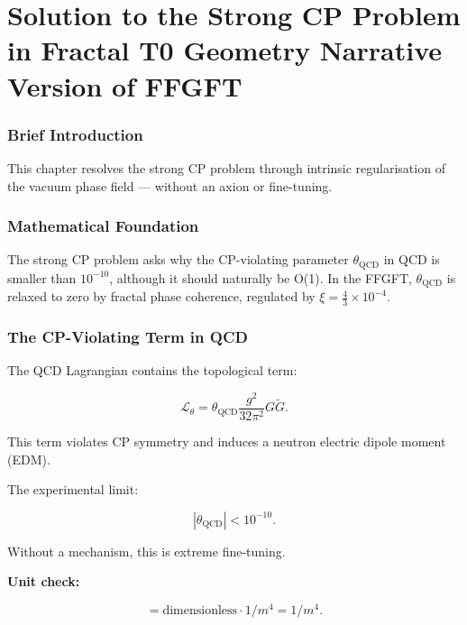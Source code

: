 \chapter{Solution to the Strong CP Problem in Fractal T0 Geometry  Narrative Version of FFGFT}


	
	\subsection*{Brief Introduction}
	
	This chapter resolves the strong CP problem through intrinsic regularisation of the vacuum phase field — without an axion or fine-tuning.
	
	\subsection*{Mathematical Foundation}
	
	The strong CP problem asks why the CP-violating parameter \(\theta_{\text{QCD}}\) in QCD is smaller than \(10^{-10}\), although it should naturally be O(1). In the FFGFT, \(\theta_{\text{QCD}}\) is relaxed to zero by fractal phase coherence, regulated by \(\xi = \frac{4}{3} \times 10^{-4}\).
	
	\subsection*{The CP-Violating Term in QCD}
	
	The QCD Lagrangian contains the topological term:
	
	\begin{equation}
		\mathcal{L}_{\theta} = \theta_{\text{QCD}} \frac{g^2}{32\pi^2} G \tilde{G}.
	\end{equation}
	
	This term violates CP symmetry and induces a neutron electric dipole moment (EDM).
	
	The experimental limit:
	
	\begin{equation}
		|\theta_{\text{QCD}}| < 10^{-10}.
	\end{equation}
	
	Without a mechanism, this is extreme fine-tuning.
	
	\textbf{Unit check:}
	
	\begin{equation}
		[\mathcal{L}_{\theta}] = \text{dimensionless} \cdot \si{1/m^{4}} = \si{1/m^{4}}.
	\end{equation}
	
